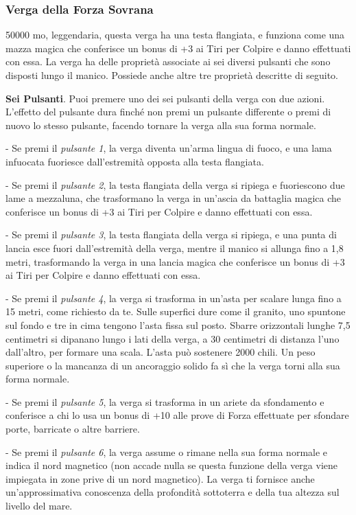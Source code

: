 \begin{multicols}{2}
\subsubsection*{Verga della Forza Sovrana}
50000 mo, leggendaria, questa verga ha una testa flangiata, e funziona come una mazza magica che conferisce un bonus di +3 ai Tiri per Colpire e danno effettuati con essa. La verga ha delle proprietà associate ai sei diversi pulsanti che sono disposti lungo il manico. Possiede anche altre tre proprietà descritte di seguito.

\textbf{Sei Pulsanti}. Puoi premere uno dei sei pulsanti della verga con due azioni. L'effetto del pulsante dura finché non premi un pulsante differente o premi di nuovo lo stesso pulsante, facendo tornare la verga alla sua forma normale.

- Se premi il \textit{pulsante 1}, la verga diventa un'arma lingua di fuoco, e una lama infuocata fuoriesce dall'estremità opposta alla testa flangiata.

- Se premi il \textit{pulsante 2}, la testa flangiata della verga si ripiega e fuoriescono due lame a mezzaluna, che trasformano la verga in un'ascia da battaglia magica che conferisce un bonus di +3 ai Tiri per Colpire e danno effettuati con essa.

- Se premi il \textit{pulsante 3}, la testa flangiata della verga si ripiega, e una punta di lancia esce fuori dall'estremità della verga, mentre il manico si allunga fino a 1,8 metri, trasformando la verga in una lancia magica che conferisce un bonus di +3 ai Tiri per Colpire e danno effettuati con essa.

- Se premi il \textit{pulsante 4}, la verga si trasforma in un'asta per scalare lunga fino a 15 metri, come richiesto da te. Sulle superfici dure come il granito, uno spuntone sul fondo e tre in cima tengono l'asta fissa sul posto. Sbarre orizzontali lunghe 7,5 centimetri si dipanano lungo i lati della verga, a 30 centimetri di distanza l'uno dall'altro, per formare una scala. L'asta può sostenere 2000 chili. Un peso superiore o la mancanza di un ancoraggio solido fa sì che la verga torni alla sua forma normale.

- Se premi il \textit{pulsante 5}, la verga si trasforma in un ariete da sfondamento e conferisce a chi lo usa un bonus di +10 alle prove di Forza effettuate per sfondare porte, barricate o altre barriere.

- Se premi il \textit{pulsante 6}, la verga assume o rimane nella sua forma normale e indica il nord magnetico (non accade nulla se questa funzione della verga viene impiegata in zone prive di un nord magnetico). La verga ti fornisce anche un'approssimativa conoscenza della profondità sottoterra e della tua altezza sul livello del mare.


\end{multicols}
